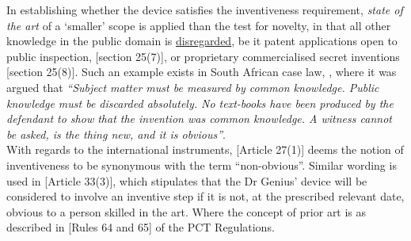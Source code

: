 \documentclass[11pt]{article}
\begin{document}
In establishing whether the device satisfies the inventiveness requirement, \emph{state of the art} of a `smaller' scope is applied than the test for novelty, in that all other knowledge in the public domain is \uline{disregarded}, be it patent applications open to public inspection, [section 25(7)]\cite{rsa78_patents_act}, or proprietary commercialised secret inventions [section 25(8)]\cite{rsa78_patents_act}. Such an example exists in South African case law,  \cite{davis42_levin_v_numplates}, where it was argued that \emph{``Subject matter must be measured by common knowledge. Public knowledge must be discarded absolutely. No text-books have been produced by the defendant to show that the invention was common knowledge. A witness cannot be asked, is the thing new, and it is obvious''}.\\

With regards to the international instruments, [Article 27(1)]\cite{wto17_trips}
deems the notion of inventiveness to be synonymous with the term
``non-obvious''. Similar wording is used in [Article 33(3)]\cite{wipo70_pct},
which stipulates that the Dr Genius' device will be considered to involve an
inventive step if it is not, at the prescribed relevant date, obvious to a
person skilled in the art. Where the concept of prior art is as described in
[Rules 64 and 65]\cite{wipo70_pct_reg} of the PCT Regulations.
\printbibliography
\end{document}
